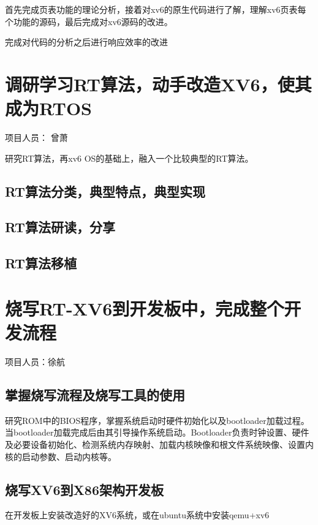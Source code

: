 首先完成页表功能的理论分析，接着对xv6的原生代码进行了解，理解xv6页表每个功能的源码，最后完成对xv6源码的改进。

完成对代码的分析之后进行响应效率的改进

\section{调研学习RT算法，动手改造XV6，使其成为RTOS}
项目人员： 曾萧

研究RT算法，再xv6 OS的基础上，融入一个比较典型的RT算法。
\subsection{RT算法分类，典型特点，典型实现}
\subsection{RT算法研读，分享}
\subsection{RT算法移植}


\section{烧写RT-XV6到开发板中，完成整个开发流程}
项目人员：徐航
\subsection{掌握烧写流程及烧写工具的使用}
研究ROM中的BIOS程序，掌握系统启动时硬件初始化以及bootloader加载过程。当bootloader加载完成后由其引导操作系统启动。Bootloader负责时钟设置、硬件及必要设备初始化、检测系统内存映射、加载内核映像和根文件系统映像、设置内核的启动参数、启动内核等。
\subsection{烧写XV6到X86架构开发板}
在开发板上安装改造好的XV6系统，或在ubuntu系统中安装qemu+xv6
